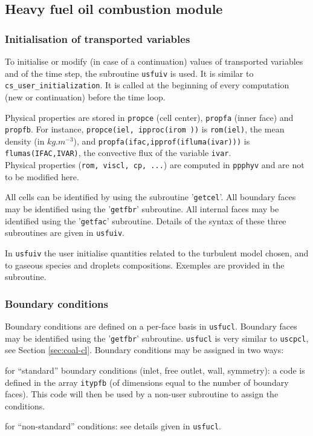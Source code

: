 {{{%
\subsection{Heavy fuel oil combustion module}
\subsubsection{Initialisation of transported variables}
To initialise or modify (in case of a continuation) values of transported variables and of the time step, the subroutine \texttt{usfuiv} is used. It is similar to \texttt{cs\_user\_initialization}. It is called at the beginning of every computation (new or continuation) before the time loop.

Physical properties are stored in \texttt{propce} (cell center), \texttt{propfa} (inner face) and \texttt{propfb}. For instance, \texttt{propce(iel, ipproc(irom  ))} is \texttt{rom(iel)}, the mean density (in $kg.m^{-3}$), and \texttt{propfa(ifac,ipprof(ifluma(ivar)))} is \texttt{flumas(IFAC,IVAR)}, the convective flux of the variable \texttt{ivar}.\\
Physical properties (\texttt{rom, viscl, cp, ...}) are computed in \texttt{ppphyv} and are not to be modified here.

All cells can be identified by using the subroutine '\texttt{getcel}'. All boundary faces may be identified using the '\texttt{getfbr}' subroutine. All internal faces may be identified using the '\texttt{getfac}' subroutine. Details of the syntax of these three subroutines are given in \texttt{usfuiv}.

In \texttt{usfuiv} the user initialise quantities related to the turbulent model chosen, and to gaseous species and droplets compositions. Exemples are provided in the subroutine.

\subsubsection{Boundary conditions}
Boundary conditions are defined on a per-face basis in \texttt{usfucl}. Boundary faces may be identified using the '\texttt{getfbr}' subroutine. \texttt{usfucl} is very similar to \texttt{uscpcl}, see Section \ref{sec:coal-cl}. Boundary conditions may be assigned in two ways:
\begin{list}{.}{}
\item for ``standard'' boundary conditions (inlet, free outlet, wall, symmetry): a code is defined in the array \texttt{itypfb} (of dimensions equal to the number of boundary faces). This code will then be used by a non-user subroutine to assign the conditions.
\item for ``non-standard'' conditions: see details given in \texttt{usfucl}.
\end{list}

}}}
